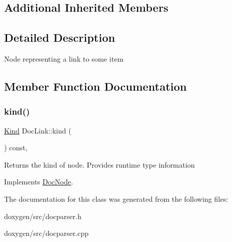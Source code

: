 \subsection*{Additional Inherited Members}


\subsection{Detailed Description}
Node representing a link to some item 

\subsection{Member Function Documentation}
\mbox{\label{class_doc_link_a320720d7a24889d3cd3d6210bfc526fa}} 
\subsubsection{\texorpdfstring{kind()}{kind()}}
{\footnotesize\ttfamily \mbox{\hyperlink{class_doc_node_aebd16e89ca590d84cbd40543ea5faadb}{Kind}} Doc\+Link\+::kind (\begin{DoxyParamCaption}{ }\end{DoxyParamCaption}) const\hspace{0.3cm}{\ttfamily [inline]}, {\ttfamily [virtual]}}

Returns the kind of node. Provides runtime type information 

Implements \mbox{\hyperlink{class_doc_node_a108ffd214a72ba6e93dac084a8f58049}{Doc\+Node}}.



The documentation for this class was generated from the following files\+:\begin{DoxyCompactItemize}
\item 
doxygen/src/docparser.\+h\item 
doxygen/src/docparser.\+cpp\end{DoxyCompactItemize}
